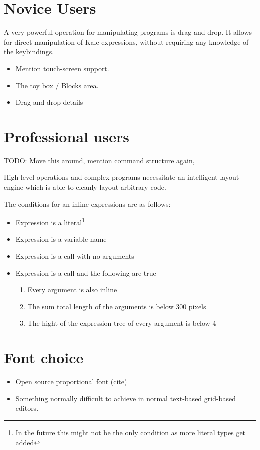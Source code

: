 \section{Novice Users}
A very powerful operation for manipulating programs is drag and drop. It allows
for direct manipulation of Kale expressions, without requiring any knowledge of
the keybindings.

\begin{itemize}
	\item Mention touch-screen support.
	\item The toy box / Blocks area.
	\item Drag and drop details
\end{itemize}

\section{Professional users}

TODO: Move this around, mention command structure again,

High level operations and complex programs necessitate an intelligent layout
engine which is able to cleanly layout arbitrary code.

The conditions for an inline expressions are as follows:

\begin{itemize}[noitemsep]
	\item Expression is a literal\footnote{In the future this might not be the
only condition as more literal types get added}
	\item Expression is a variable name
	\item Expression is a call with no arguments
	\item Expression is a call and the following are true
	\begin{enumerate}[noitemsep]
		\item Every argument is also inline
		\item The sum total length of the arguments is below 300 pixels
		\item The hight of the expression tree of every argument is below 4
	\end{enumerate}
\end{itemize}

\section{Font choice}

\begin{itemize}
	\item Open source proportional font (cite)
	\item Something normally difficult to achieve in normal text-based grid-based
	editors.
	
\end{itemize}